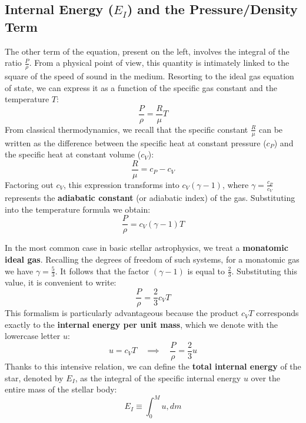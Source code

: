 \subsection{Internal Energy ($E_I$) and the Pressure/Density Term}
The other term of the equation, present on the left, involves the integral of the ratio $\frac{P}{\rho}$. From a physical point of view, this quantity is intimately linked to the square of the speed of sound in the medium. Resorting to the ideal gas equation of state, we can express it as a function of the specific gas constant and the temperature $T$:
\begin{equation}
\frac{P}{\rho} = \frac{R}{\mu} T
\end{equation}
From classical thermodynamics, we recall that the specific constant $\frac{R}{\mu}$ can be written as the difference between the specific heat at constant pressure ($c_P$) and the specific heat at constant volume ($c_V$):
\begin{equation}
\frac{R}{\mu} = c_P - c_V
\end{equation}
Factoring out $c_V$, this expression transforms into $c_V (\gamma - 1)$, where $\gamma = \frac{c_P}{c_V}$ represents the \textbf{adiabatic constant} (or adiabatic index) of the gas. Substituting into the temperature formula we obtain:
\begin{equation}
\frac{P}{\rho} = c_V (\gamma - 1) T
\end{equation}

In the most common case in basic stellar astrophysics, we treat a \textbf{monatomic ideal gas}. Recalling the degrees of freedom of such systems, for a monatomic gas we have $\gamma = \frac{5}{3}$. It follows that the factor $(\gamma - 1)$ is equal to $\frac{2}{3}$.
Substituting this value, it is convenient to write:
\begin{equation}
\frac{P}{\rho} = \frac{2}{3} c_V T
\end{equation}
This formalism is particularly advantageous because the product $c_V T$ corresponds exactly to the \textbf{internal energy per unit mass}, which we denote with the lowercase letter $u$:
\begin{equation}
u = c_V T \quad \implies \quad \frac{P}{\rho} = \frac{2}{3} u
\end{equation}
Thanks to this intensive relation, we can define the \textbf{total internal energy} of the star, denoted by $E_I$, as the integral of the specific internal energy $u$ over the entire mass of the stellar body:
\begin{equation}
E_I \equiv \int_{0}^{M} u , dm
\end{equation}

